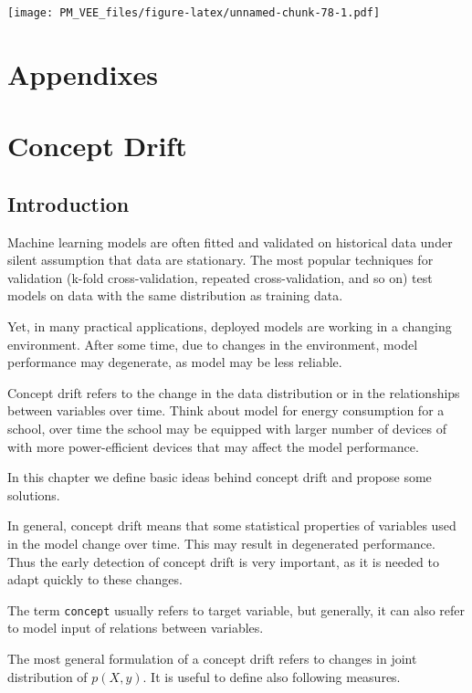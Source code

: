 \documentclass[12pt,]{krantz}
\begin{document}
\texttt{[image: PM\_VEE\_files/figure-latex/unnamed-chunk-78-1.pdf]}

\hypertarget{appendixes}{%
\section*{Appendixes}\label{appendixes}}

\hypertarget{conceptDrift}{%
\section{Concept Drift}\label{conceptDrift}}

\hypertarget{DriftIntro}{%
\subsection{Introduction}\label{DriftIntro}}

Machine learning models are often fitted and validated on historical data under silent assumption that data are stationary. The most popular techniques for validation (k-fold cross-validation, repeated cross-validation, and so on) test models on data with the same distribution as training data.

Yet, in many practical applications, deployed models are working in a changing environment. After some time, due to changes in the environment, model performance may degenerate, as model may be less reliable.

Concept drift refers to the change in the data distribution or in the relationships between variables over time. Think about model for energy consumption for a school, over time the school may be equipped with larger number of devices of with more power-efficient devices that may affect the model performance.

In this chapter we define basic ideas behind concept drift and propose some solutions.

In general, concept drift means that some statistical properties of variables used in the model change over time. This may result in degenerated performance. Thus the early detection of concept drift is very important, as it is needed to adapt quickly to these changes.

The term \texttt{concept} usually refers to target variable, but generally, it can also refer to model input of relations between variables.

The most general formulation of a concept drift refers to changes in joint distribution of \(p(X, y)\). It is useful to define also following measures.
\end{document}
